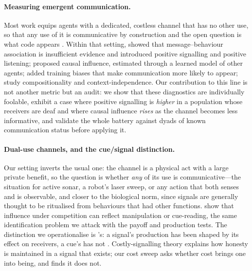 \documentclass[10pt,twoside]{article}
\begin{document}
\paragraph{Measuring emergent communication.} Most work equips agents with a
dedicated, costless channel that has no other use, so that any use of it is
communicative by construction and the open question is what code appears
\citep{foerster2016learning,mordatch2018emergence,lazaridou2017multi,lazaridou2018emergence}.
Within that setting, \citet{lowe2019pitfalls} showed that message--behaviour
association is insufficient evidence and introduced positive signalling and
positive listening; \citet{jaques2019social} proposed causal influence, estimated
through a learned model of other agents; \citet{eccles2019biases} added training
biases that make communication more likely to appear;
\citet{bogin2018emergence,chaabouni2020compositionality} study compositionality
and context-independence. Our contribution to this line is not another metric but
an audit: we show that these diagnostics are individually foolable, exhibit a case
where positive signalling is \emph{higher} in a population whose receivers are
deaf and where causal influence \emph{rises} as the channel becomes less
informative, and validate the whole battery against dyads of known communication
status before applying it.

\paragraph{Dual-use channels, and the cue/signal distinction.} Our setting
inverts the usual one: the channel is a physical act with a large private
benefit, so the question is whether \emph{any} of its use is communicative---the
situation for active sonar, a robot's laser sweep, or any action that both senses
and is observable, and closer to the biological norm, since signals are generally
thought to be ritualised from behaviours that had other functions.
\citet{noukhovitch2021emergent} show that influence under competition can reflect
manipulation or cue-reading, the same identification problem we attack with the
payoff and production tests. The distinction we operationalise is
\citeauthor{scottphillips2008defining}'s: a signal's production has been shaped by
its effect on receivers, a cue's has not
\citep{scottphillips2008defining,maynardsmith2003animal}. Costly-signalling theory
\citep{zahavi1975mate,grafen1990biological,szamado2011cost} explains how honesty is
maintained in a signal that exists; our cost sweep asks whether cost brings one
into being, and finds it does not.
\end{document}
